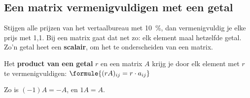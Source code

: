 \begin{oefeningen}
\end{oefeningen}

\subsection{Een matrix vermenigvuldigen met een getal}

Stijgen alle prijzen van het vertaalbureau met 10~\%, dan vermenigvuldig je elke prijs met 1,1. Bij een matrix gaat dat net zo: elk element maal hetzelfde getal. Zo'n getal heet een \textbf{scalair}, om het te onderscheiden van een matrix.

\begin{theorie}
Het \textbf{\textcolor{accent}{product van een getal}} $r$ en een matrix $A$ krijg je door elk element met $r$ te vermenigvuldigen: \quad $\formule{(rA)_{ij} = r \cdot a_{ij}}$
\end{theorie}

Zo is $(-1)A = -A$, en $1A = A$.


